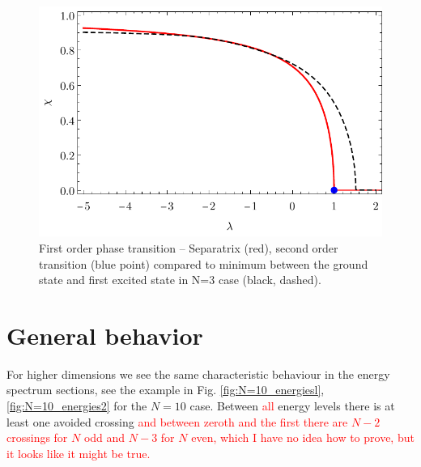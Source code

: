 \begin{figure}[H]
    \centering
    \includegraphics{../img/infiniteN_transitionCompare.pdf}
    \caption{First order phase transition -- Separatrix (red), second order transition (blue point) compared to minimum between the ground state and first excited state in N=3 case (black, dashed).}
    \label{fig:transitionCompare}    
\end{figure}












\section{General behavior}
For higher dimensions we see the same characteristic behaviour in the energy spectrum sections, see the example in Fig. \ref{fig:N=10_energiesl}, \ref{fig:N=10_energies2} for the $N=10$ case. Between \textcolor{red}{all} energy levels there is at least one avoided crossing \textcolor{red}{and between zeroth and the first there are $N-2$ crossings for $N$ odd and $N-3$ for $N$ even, which I have no idea how to prove, but it looks like it might be true.}


